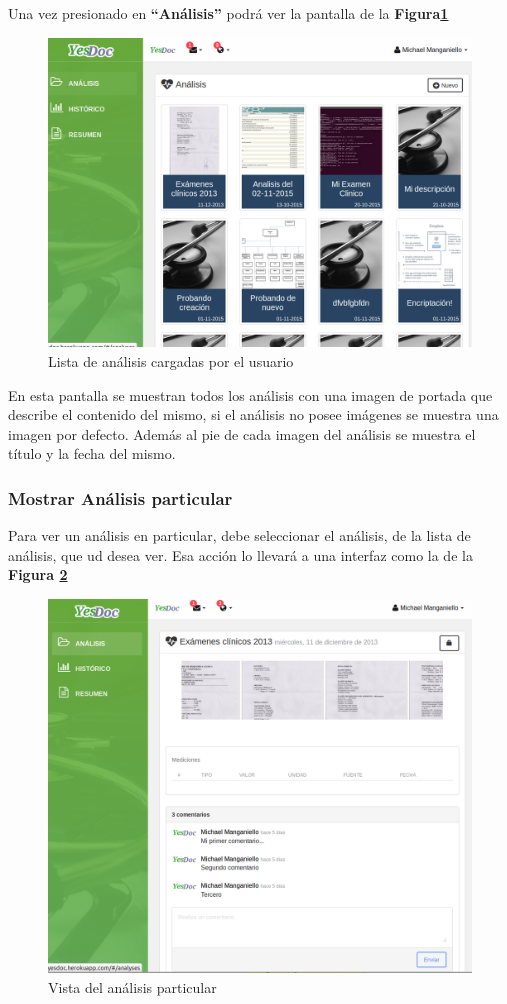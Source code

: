 Una vez presionado en \textbf{``Análisis''} podrá ver la pantalla de la \textbf{Figura\ref{mu-listar_analisis}}


\begin{figure}
	\centering
	\includegraphics[width=.8\textwidth]{img/manual_de_usuario/listar_analisis}
	\caption{Lista de análisis cargadas por el usuario}
	\label{mu-listar_analisis}
\end{figure}
 
 
 En esta pantalla se muestran todos los análisis con una imagen de portada que describe  el contenido del mismo, si el análisis no posee imágenes se muestra una imagen por defecto. Además al pie de cada imagen del análisis se muestra el título y la fecha del mismo.
 

 \subsubsection{Mostrar Análisis particular}
Para ver un análisis en particular, debe seleccionar el análisis, de la lista de análisis, que ud desea ver. Esa acción lo llevará a una interfaz como la de la \textbf{Figura \ref{mu-analisis_particular}}
\begin{figure}
	\centering
	\includegraphics[width=.8\textwidth]{img/manual_de_usuario/analisis_particular}
	\caption{Vista del análisis particular}
	\label{mu-analisis_particular}
\end{figure}


